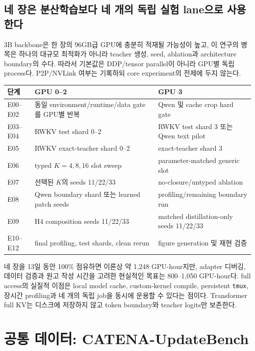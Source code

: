 \documentclass[10.5pt,a4paper]{article}
\newcommand{\code}[1]{\texttt{#1}}
\begin{document}
\subsection{네 장은 분산학습보다 네 개의 독립 실험 lane으로 사용한다}

3B backbone은 한 장의 96GB급 GPU에 충분히 적재될 가능성이 높고, 이 연구의 병목은 하나의 대규모 최적화가 아니라 teacher 생성, seed, ablation과 architecture boundary의 수다. 따라서 기본값은 DDP/tensor parallel이 아니라 GPU별 독립 process다. P2P/NVLink 여부는 기록하되 core experiment의 전제에 두지 않는다.

\begin{table}[H]
\centering
\begin{tabularx}{\textwidth}{@{}L{22mm}L{44mm}Y@{}}
\toprule
단계 & GPU 0--2 & GPU 3 \\
\midrule
E00--E02 & 동일 environment/runtime/data gate를 GPU별 반복 & Qwen 및 cache crop hard gate \\
E03--E04 & RWKV test shard 0--2 & RWKV test shard 3 또는 Qwen text pilot \\
E05 & RWKV exact-teacher shard 0--2 & exact-teacher shard 3 \\
E06 & typed $K=4,8,16$ slot sweep & parameter-matched generic slot \\
E07 & 선택된 $K$의 seeds 11/22/33 & no-closure/untyped ablation \\
E08 & Qwen boundary shard 또는 learned patch seeds & profiling/remaining boundary run \\
E09 & H4 composition seeds 11/22/33 & matched distillation-only seeds 11/22/33 \\
E10--E12 & final profiling, test shards, clean rerun & figure generation 및 재현 검증 \\
\bottomrule
\end{tabularx}
\end{table}

네 장을 13일 동안 100\% 점유하면 이론상 약 1,248 GPU-hour지만, adapter 디버깅, 데이터 검증과 원고 작성 시간을 고려한 현실적인 목표는 800--1,050 GPU-hour다. full access의 실질적 이점은 local model cache, custom-kernel compile, persistent \code{tmux}, 장시간 profiling과 네 개의 독립 job을 동시에 운용할 수 있다는 점이다. Transformer full KV는 디스크에 저장하지 않고 token boundary와 teacher logits만 보존한다.

\section{공통 데이터: CATENA-UpdateBench}
\end{document}
